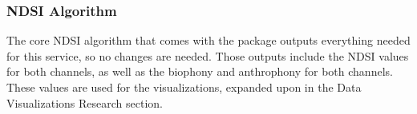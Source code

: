\subsubsection{NDSI Algorithm}
The core NDSI algorithm that comes with the  package outputs everything needed for this service, so no changes are needed. Those outputs include the NDSI values for both channels, as well as the biophony and anthrophony for both channels. These values are used for the visualizations, expanded upon in the Data Visualizations Research section.
